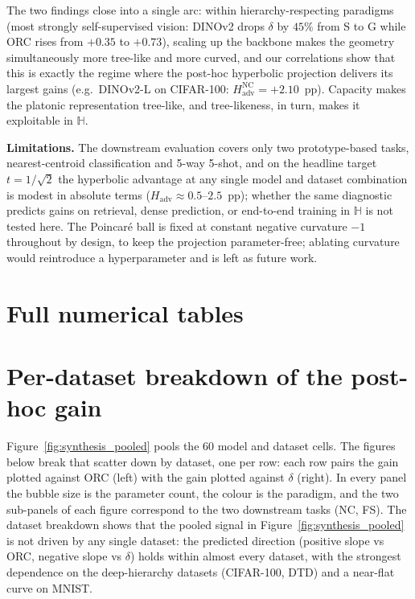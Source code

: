 \documentclass{article}
\begin{document}
The two findings close into a single arc: within hierarchy-respecting paradigms (most strongly self-supervised vision: DINOv2 drops $\delta$ by $45\%$ from S to G while ORC rises from $+0.35$ to $+0.73$), scaling up the backbone makes the geometry simultaneously more tree-like and more curved, and our correlations show that this is exactly the regime where the post-hoc hyperbolic projection delivers its largest gains (e.g.\ DINOv2-L on CIFAR-100: $H_{\mathrm{adv}}^{\text{NC}} = +2.10$~pp). Capacity makes the platonic representation tree-like, and tree-likeness, in turn, makes it exploitable in $\mathbb{H}$.

\textbf{Limitations.} The downstream evaluation covers only two prototype-based tasks, nearest-centroid classification and 5-way 5-shot, and on the headline target $t = 1/\sqrt{2}$ the hyperbolic advantage at any single model and dataset combination is modest in absolute terms ($H_{\mathrm{adv}} \approx 0.5$--$2.5$~pp); whether the same diagnostic predicts gains on retrieval, dense prediction, or end-to-end training in $\mathbb{H}$ is not tested here. The Poincar\'{e} ball is fixed at constant negative curvature $-1$ throughout by design, to keep the projection parameter-free; ablating curvature would reintroduce a hyperparameter and is left as future work.


\begin{ack}
\end{ack}

\FloatBarrier



\clearpage
\appendix
\section{Full numerical tables}
\label{app:tables}







\FloatBarrier

\section{Per-dataset breakdown of the post-hoc gain}
\label{app:per-dataset-gain}
Figure~\ref{fig:synthesis_pooled} pools the $60$ model and dataset cells. The figures below break that scatter down by dataset, one per row: each row pairs the gain plotted against ORC (left) with the gain plotted against $\delta$ (right). In every panel the bubble size is the parameter count, the colour is the paradigm, and the two sub-panels of each figure correspond to the two downstream tasks (NC, FS). The dataset breakdown shows that the pooled signal in Figure~\ref{fig:synthesis_pooled} is not driven by any single dataset: the predicted direction (positive slope vs ORC, negative slope vs $\delta$) holds within almost every dataset, with the strongest dependence on the deep-hierarchy datasets (CIFAR-100, DTD) and a near-flat curve on MNIST.
\end{document}

